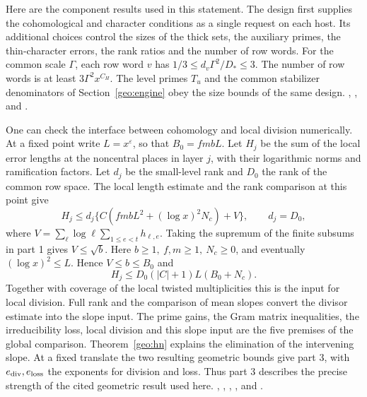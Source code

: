 Here are the component results used in this statement. The design
first supplies the cohomological and character conditions as a single
request on each host. Its additional choices control the sizes of
the thick sets, the auxiliary primes, the thin-character errors,
the rank ratios and the number of row words. For the common scale
\(\Gamma\), each row word \(v\) has
\(1/3\le d_v\Gamma^2/D_*\le3\). The number of row words is at least
\(3\Gamma^2x^{C_H}\). The level primes \(T_u\) and the common
stabilizer denominators of Section~\ref{geo:engine} obey the size
bounds of the same design.
,
,
 and
.

One can check the interface between cohomology and local division
numerically. At a fixed point write \(L=x^\varepsilon\), so that
\(B_0=fmbL\). Let \(H_j\) be the sum of the local error lengths
at the noncentral places in layer \(j\), with their logarithmic norms
and ramification factors. Let \(d_j\) be the small-level rank and
\(D_0\) the rank of the common row space. The local length estimate
and the rank comparison at this point give
\[
 H_j\le d_j\{C(fmbL^2+(\log x)^2N_c)+V\},\qquad d_j=D_0,
\]
where \(V=\sum_\ell\log\ell\sum_{1\le e<t}h_{\ell,e}\).
Taking the supremum of the finite subsums in part 1 gives
\(V\le\sqrt b\). Here \(b\ge1,\ f,m\ge1,\ N_c\ge0\), and eventually
\((\log x)^2\le L\). Hence \(V\le b\le B_0\) and
\[
                  H_j\le D_0(|C|+1)L(B_0+N_c).
\]
Together with coverage of the local twisted multiplicities this
is the input for local division. Full rank and the comparison of
mean slopes convert the divisor estimate into the slope input.
The prime gains, the Gram matrix inequalities, the irreducibility
loss, local division and this slope input are the five premises of
the global comparison. Theorem~\ref{geo:hn} explains the elimination
of the intervening slope. At a fixed translate the two resulting
geometric bounds give part 3, with \(e_{\rm div},e_{\rm loss}\)
the exponents for division and loss. Thus part 3 describes the
precise strength of the cited geometric result used here.
,
,
,
,
 and
.

